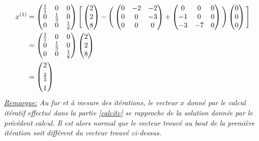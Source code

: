 \documentclass{report}
\begin{document}
\begin{align}
x^{(1)}&=\begin{pmatrix}
  \frac{1}{1}&0&0\\
  0&\frac{1}{3}&0\\
  0&0&\frac{1}{8}\\
\end{pmatrix}\Bigg[\begin{pmatrix}
  2 \\
  2 \\
  8 \\
\end{pmatrix}-\Bigg(\begin{pmatrix}
  0&-2&-2\\
  0&0&-3\\
  0&0&0\\
\end{pmatrix}+\begin{pmatrix}
  0&0&0\\
  -1&0&0\\
  -3&-7&0\\
\end{pmatrix}\Bigg)\begin{pmatrix}
  0 \\
  0 \\
  0 \\
\end{pmatrix}\Bigg]\\
&=\begin{pmatrix}
  \frac{1}{1}&0&0\\
  0&\frac{1}{3}&0\\
  0&0&\frac{1}{8}\\
\end{pmatrix}\begin{pmatrix}
  2 \\
  2 \\
  8 \\
\end{pmatrix}\\
&=\begin{pmatrix}
  2 \vspace{4pt}\\
  \frac{2}{3} \vspace{4pt}\\
  1 \\
\end{pmatrix}
\end{align}
\textit{\underline{Remarque:} Au fur et à mesure des itérations, le vecteur $x$ donné par le calcul itératif effectué dans la partie \ref{calcite} se rapproche de la solution donnée par le précédent calcul. Il est alors normal que le vecteur trouvé au bout de la première itération soit différent du vecteur trouvé ci-dessus.}
\end{document}
